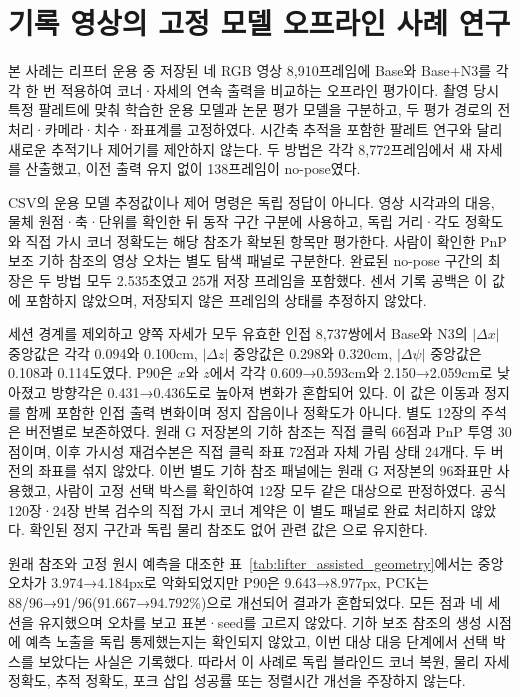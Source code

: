 \section{기록 영상의 고정 모델 오프라인 사례 연구}\label{sec:case}
본 사례는 리프터 운용 중 저장된 네 RGB 영상 8,910프레임에 Base와 Base+N3를 각각 한 번 적용하여 코너·자세의 연속 출력을 비교하는 오프라인 평가이다. 촬영 당시 특정 팔레트에 맞춰 학습한 운용 모델과 논문 평가 모델을 구분하고, 두 평가 경로의 전처리·카메라·치수·좌표계를 고정하였다. 시간축 추적을 포함한 팔레트 연구\cite{mohamed2020}와 달리 새로운 추적기나 제어기를 제안하지 않는다. 두 방법은 각각 8,772프레임에서 새 자세를 산출했고, 이전 출력 유지 없이 138프레임이 no-pose였다.

CSV의 운용 모델 추정값이나 제어 명령은 독립 정답이 아니다. 영상 시각과의 대응, 물체 원점·축·단위를 확인한 뒤 동작 구간 구분에 사용하고, 독립 거리·각도 정확도와 직접 가시 코너 정확도는 해당 참조가 확보된 항목만 평가한다. 사람이 확인한 PnP 보조 기하 참조의 영상 오차는 별도 탐색 패널로 구분한다. 완료된 no-pose 구간의 최장은 두 방법 모두 2.535초였고 25개 저장 프레임을 포함했다. 센서 기록 공백은 이 값에 포함하지 않았으며, 저장되지 않은 프레임의 상태를 추정하지 않았다.

세션 경계를 제외하고 양쪽 자세가 모두 유효한 인접 8,737쌍에서 Base와 N3의 $|\Delta x|$ 중앙값은 각각 0.094와 0.100cm, $|\Delta z|$ 중앙값은 0.298와 0.320cm, $|\Delta\psi|$ 중앙값은 0.108과 0.114도였다. P90은 $x$와 $z$에서 각각 0.609→0.593cm와 2.150→2.059cm로 낮아졌고 방향각은 0.431→0.436도로 높아져 변화가 혼합되어 있다. 이 값은 이동과 정지를 함께 포함한 인접 출력 변화이며 정지 잡음이나 정확도가 아니다. 별도 12장의 주석은 버전별로 보존하였다. 원래 G 저장본의 기하 참조는 직접 클릭 66점과 PnP 투영 30점이며, 이후 가시성 재검수본은 직접 클릭 좌표 72점과 자체 가림 상태 24개다. 두 버전의 좌표를 섞지 않았다. 이번 별도 기하 참조 패널에는 원래 G 저장본의 96좌표만 사용했고, 사람이 고정 선택 박스를 확인하여 12장 모두 같은 대상으로 판정하였다. 공식 120장·24장 반복 검수의 직접 가시 코너 계약은 이 별도 패널로 완료 처리하지 않았다. 확인된 정지 구간과 독립 물리 참조도 없어 관련 값은 \notrun 으로 유지한다.

원래 참조와 고정 원시 예측을 대조한 표~\ref{tab:lifter_assisted_geometry}에서는 중앙 오차가 3.974→4.184px로 악화되었지만 P90은 9.643→8.977px, PCK는 88/96→91/96(91.667→94.792\%)으로 개선되어 결과가 혼합되었다. 모든 점과 네 세션을 유지했으며 오차를 보고 표본·seed를 고르지 않았다. 기하 보조 참조의 생성 시점에 예측 노출을 독립 통제했는지는 확인되지 않았고, 이번 대상 대응 단계에서 선택 박스를 보았다는 사실은 기록했다. 따라서 이 사례로 독립 블라인드 코너 복원, 물리 자세 정확도, 추적 정확도, 포크 삽입 성공률 또는 정렬시간 개선을 주장하지 않는다.



